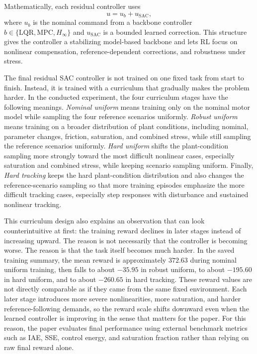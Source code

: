 \documentclass[conference]{IEEEtran}
\begin{document}
Mathematically, each residual controller uses
\begin{equation}
u = u_b + u_{\mathrm{SAC}},
\label{eq:residual_control}
\end{equation}
where $u_b$ is the nominal command from a backbone controller $b \in \{\mathrm{LQR}, \mathrm{MPC}, H_\infty\}$ and $u_{\mathrm{SAC}}$ is a bounded learned correction. This structure gives the controller a stabilizing model-based backbone and lets RL focus on nonlinear compensation, reference-dependent corrections, and robustness under stress.

The final residual SAC controller is not trained on one fixed task from start to finish. Instead, it is trained with a curriculum that gradually makes the problem harder. In the conducted experiment, the four curriculum stages have the following meanings. \emph{Nominal uniform} means training only on the nominal motor model while sampling the four reference scenarios uniformly. \emph{Robust uniform} means training on a broader distribution of plant conditions, including nominal, parameter changes, friction, saturation, and combined stress, while still sampling the reference scenarios uniformly. \emph{Hard uniform} shifts the plant-condition sampling more strongly toward the most difficult nonlinear cases, especially saturation and combined stress, while keeping scenario sampling uniform. Finally, \emph{Hard tracking} keeps the hard plant-condition distribution and also changes the reference-scenario sampling so that more training episodes emphasize the more difficult tracking cases, especially step responses with disturbance and sustained nonlinear tracking.

This curriculum design also explains an observation that can look counterintuitive at first: the training reward declines in later stages instead of increasing upward. The reason is not necessarily that the controller is becoming worse. The reason is that the task itself becomes much harder. In the saved training summary, the mean reward is approximately $372.63$ during nominal uniform training, then falls to about $-35.95$ in robust uniform, to about $-195.60$ in hard uniform, and to about $-260.65$ in hard tracking. These reward values are not directly comparable as if they came from the same fixed environment. Each later stage introduces more severe nonlinearities, more saturation, and harder reference-following demands, so the reward scale shifts downward even when the learned controller is improving in the sense that matters for the paper. For this reason, the paper evaluates final performance using external benchmark metrics such as IAE, SSE, control energy, and saturation fraction rather than relying on raw final reward alone.
\end{document}
